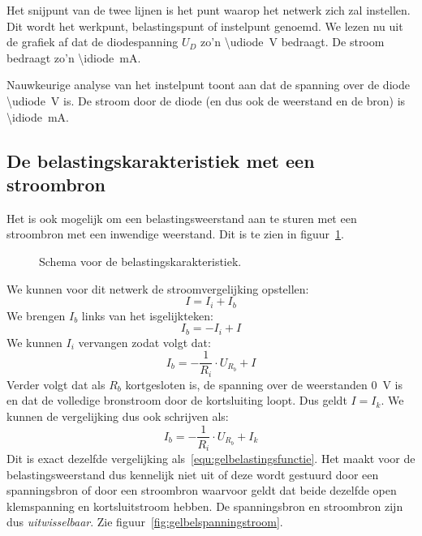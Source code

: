 Het snijpunt van de twee lijnen is het punt waarop het netwerk zich zal instellen. Dit wordt het werkpunt,
belastingspunt of instelpunt genoemd. We lezen nu uit de grafiek af dat de diodespanning $U_D$ zo'n
\SI[round-mode=places,round-precision=1]{\udiode}{\volt} bedraagt. De stroom bedraagt zo'n
\SI[round-mode=places,round-precision=0]{\idiode}{\milli\ampere}.

Nauwkeurige analyse van het instelpunt toont aan dat de spanning over de diode
\SI[round-mode=places,round-precision=2]{\udiode}{\volt} is. De stroom door de diode (en dus ook de
weerstand en de bron) is \SI[round-mode=places,round-precision=2]{\idiode}{\milli\ampere}.

\subsection{De belastingskarakteristiek met een stroombron}
Het is ook mogelijk om een belastingsweerstand aan te sturen met een stroombron met een inwendige weerstand.
Dit is te zien in figuur~\ref{fig:gelschemavoorbelastingskarakteristiekstroombron}.

\begin{figure}[!ht]
\centering
{}
\caption{Schema voor de belastingskarakteristiek.}
\label{fig:gelschemavoorbelastingskarakteristiekstroombron}
\end{figure}

We kunnen voor dit netwerk de stroomvergelijking opstellen:
%
\begin{equation}
I = I_i + I_b
\end{equation}
%
We brengen $I_b$ links van het isgelijkteken:
\begin{equation}
I_b = -I_i + I
\end{equation}
%
We kunnen $I_i$ vervangen zodat volgt dat:
%
\begin{equation}
I_b = -\dfrac{1}{R_i}\cdot U_{R_b} + I
\end{equation}
%
Verder volgt dat als $R_b$ kortgesloten is, de spanning over de weerstanden \SI{0}{\volt} is en dat de
volledige bronstroom door de kortsluiting loopt. Dus geldt $I=I_k$. We kunnen de vergelijking
dus ook schrijven als:
%
\begin{equation}
I_b = -\dfrac{1}{R_i}\cdot U_{R_b} + I_k
\end{equation}
%
Dit is exact dezelfde vergelijking als~\eqref{equ:gelbelastingsfunctie}. Het maakt voor de
belastingsweerstand dus kennelijk niet uit of deze wordt gestuurd door een spanningsbron of door een
stroombron waarvoor geldt dat beide dezelfde open klemspanning en kortsluitstroom hebben. De
spanningsbron en stroombron zijn dus \textsl{uitwisselbaar}. Zie figuur~\ref{fig:gelbelspanningstroom}.

